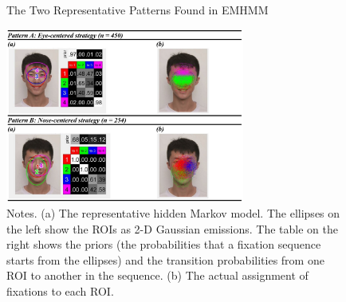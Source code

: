 \begin{figure}[h!] 
\caption{\label{fig:gearhead} The Two Representative Patterns Found in EMHMM}
\centering
\includegraphics[width=0.7\textwidth]{frog_1.jpg}
\caption*{Notes. (a) The representative hidden Markov model. The ellipses on the left show the ROIs as 2-D Gaussian emissions. The table on the right shows the priors (the probabilities that a fixation sequence starts from the ellipses) and the transition probabilities from one ROI to another in the sequence. (b) The actual assignment of fixations to each ROI.}
\end{figure}
